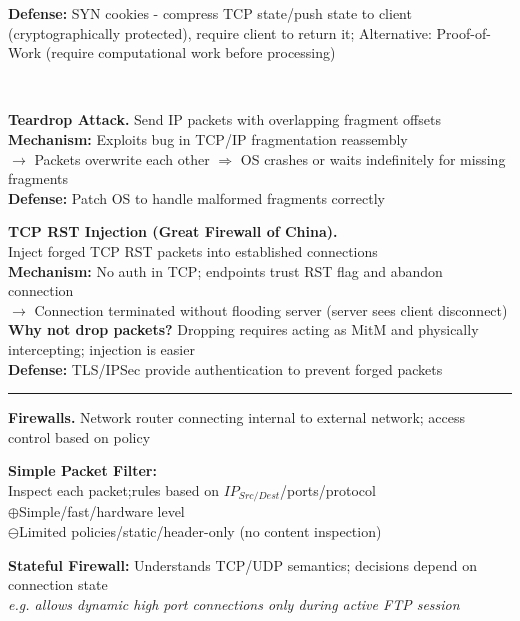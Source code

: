 \documentclass[9pt, a4paper]{extarticle}
\makeatletter
\renewcommand{\hline}{\noalign{\vskip 2px}\hrule\@height\arrayrulewidth\@width\linewidth\noalign{\vskip 2px}}
\makeatother
\begin{document}
\begin{minipage}[t]{0.495\textwidth}
\begin{minipage}[t]{0.68\textwidth}
		\textbf{Defense:} SYN cookies - compress TCP state/push state to client (cryptographically protected), require client to return it; Alternative: Proof-of-Work (require computational work before processing)
	\end{minipage}\\
	\begin{minipage}[t]{0.34\textwidth}
		\textbf{Teardrop Attack.} Send IP packets with overlapping fragment offsets\\
		\textbf{Mechanism:} Exploits bug in TCP/IP fragmentation reassembly\\
		$\rightarrow$ Packets overwrite each other $\Rightarrow$ OS crashes or waits indefinitely for missing fragments\\
		\textbf{Defense:} Patch OS to handle malformed fragments correctly
	\end{minipage}\hfill\vline\hfill
	\begin{minipage}[t]{0.64\textwidth}
		\textbf{TCP RST Injection (Great Firewall of China).}\\
		Inject forged TCP RST packets into established connections\\
		\textbf{Mechanism:} No auth in TCP; endpoints trust RST flag and abandon connection\\
		$\rightarrow$ Connection terminated without flooding server (server sees client disconnect)\\
		\textbf{Why not drop packets?} Dropping requires acting as MitM and physically intercepting; injection is easier\\
		\textbf{Defense:} TLS/IPSec provide authentication to prevent forged packets
	\end{minipage}
	\hline
	\textbf{Firewalls.}
	Network router connecting internal to external network; access control based on policy\\
	\begin{minipage}[t]{0.34\textwidth}
		\textbf{Simple Packet Filter:}\\Inspect each packet;rules based on $IP_{Src/Dest}$/ports/protocol\\
		$\oplus$Simple/fast/hardware level\\
		$\ominus$Limited policies/static/header-only (no content inspection)
	\end{minipage}\hfill
	\begin{minipage}[t]{0.32\textwidth}
		\textbf{Stateful Firewall:} Understands TCP/UDP semantics; decisions depend on connection state\\
		\textit{e.g. allows dynamic high port connections only during active FTP session}

\end{minipage}
\end{minipage}
\end{document}
